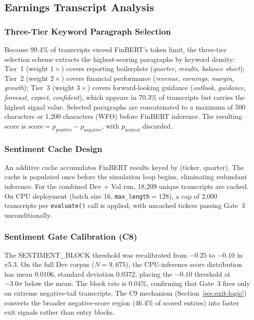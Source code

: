 \documentclass[11pt,twoside,a4paper]{article}
\begin{document}
\subsection{Earnings Transcript Analysis}

\subsubsection{Three-Tier Keyword Paragraph Selection}

Because 99.4\% of transcripts exceed FinBERT's token limit, the three-tier selection scheme extracts the highest-scoring paragraphs by keyword density: Tier~1 (weight $1\times$) covers reporting boilerplate (\textit{quarter}, \textit{results}, \textit{balance sheet}); Tier~2 (weight $2\times$) covers financial performance (\textit{revenue}, \textit{earnings}, \textit{margin}, \textit{growth}); Tier~3 (weight $3\times$) covers forward-looking guidance (\textit{outlook}, \textit{guidance}, \textit{forecast}, \textit{expect}, \textit{confident}), which appears in 70.3\% of transcripts but carries the highest signal value. Selected paragraphs are concatenated to a maximum of 500 characters or 1,200 characters (WFO) before FinBERT inference. The resulting score is $\text{score} = p_{\text{positive}} - p_{\text{negative}}$, with $p_{\text{neutral}}$ discarded.

\subsubsection{Sentiment Cache Design}

An additive cache accumulates FinBERT results keyed by (ticker, quarter). The cache is populated once before the simulation loop begins, eliminating redundant inference. For the combined Dev + Val run, 18,209 unique transcripts are cached. On CPU deployment (batch size 16, \texttt{max\_length}$=128$), a cap of 2,000 transcripts per \texttt{evaluate()} call is applied, with uncached tickers passing Gate~3 unconditionally.

\subsubsection{Sentiment Gate Calibration (C8)}
\label{sec:sentiment-gate}

The SENTIMENT\_BLOCK threshold was recalibrated from $-0.25$ to $-0.10$ in v5.3. On the full Dev corpus ($N=9{,}675$), the CPU-inference score distribution has mean $0.0106$, standard deviation $0.0372$, placing the $-0.10$ threshold at $-3.0\sigma$ below the mean. The block rate is 0.04\%, confirming that Gate~3 fires only on extreme negative-tail transcripts. The C9 mechanism (Section~\ref{sec:exit-logic}) converts the broader negative-score region (46.4\% of scored entries) into faster exit signals rather than entry blocks.
\end{document}
